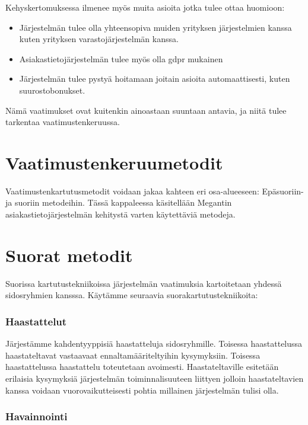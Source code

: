     Kehyskertomuksessa ilmenee myös muita asioita jotka tulee ottaa huomioon:
    
    \begin{itemize}
        \item Järjestelmän tulee olla yhteensopiva muiden yrityksen järjestelmien kanssa kuten yrityksen varastojärjestelmän kanssa.
	\item Asiakastietojärjestelmän tulee myös olla \gls{gdpr} mukainen
        \item Järjestelmän tulee pystyä hoitamaan joitain asioita automaattisesti, kuten suurostobonukset.
    \end{itemize}

    Nämä vaatimukset ovat kuitenkin ainoastaan suuntaan antavia, ja niitä tulee tarkentaa vaatimustenkeruussa. 


\section{Vaatimustenkeruumetodit}

    Vaatimustenkartutusmetodit voidaan jakaa kahteen eri osa-alueeseen: Epäsuoriin- ja suoriin metodeihin.
    Tässä kappaleessa käsitellään Megantin asiakastietojärjestelmän kehitystä varten käytettäviä metodeja.


    \section*{Suorat metodit}

        Suorissa kartutustekniikoissa järjestelmän vaatimuksia kartoitetaan yhdessä sidosryhmien kansssa.
        Käytämme seuraavia suorakartutustekniikoita:

        \subsubsection*{Haastattelut}

            Järjestämme kahdentyyppisiä haastatteluja sidosryhmille. Toisessa haastattelussa haastateltavat vastaavaat ennaltamääriteltyihin kysymyksiin. 
            Toisessa haastattelussa haastattelu toteutetaan avoimesti. Haastateltaville esitetään erilaisia kysymyksiä järjestelmän toiminnalisuuteen liittyen jolloin
            haastateltavien kanssa voidaan vuorovaikutteisesti pohtia millainen järjestelmän tulisi olla.

        \subsubsection*{Havainnointi}

